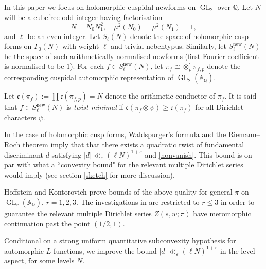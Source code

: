 \documentclass[12pt,reqno]{amsart}
\theoremstyle{plain}
\theoremstyle{remark}
\numberwithin{equation}{section}
\numberwithin{lemma}{section}
\numberwithin{theorem}{section}
\numberwithin{prop}{section}
\numberwithin{remark}{section}
\begin{document}
In this paper we focus on holomorphic cuspidal newforms 
on $\operatorname{GL}_2$ over $\mathbb{Q}$.
Let $N$ will be a cubefree odd integer having factorisation 
\begin{equation} \label{factorise}
N=N_0 N_1^2, \quad \mu^2(N_0)=\mu^2(N_1)=1,
\end{equation}
and $\ell$ be an even integer. Let $S_{\ell}(N)$ denote the space of holomorphic cusp forms 
on $\Gamma_0(N)$ with weight $\ell$ and trivial nebentypus. Similarly, let 
$S^{\text{new}}_{\ell}(N)$ be the space of such arithmetically normalised newforms 
(first Fourier coefficient is normalised to be $1$).
For each $f \in S^{\text{new}}_{\ell}(N)$, let $\pi_f \cong \otimes^{\prime}_p \pi_{f,p}$ 
denote the corresponding cuspidal automorphic representation of 
$\operatorname{GL}_2(\mathbb{A}_{\mathbb{Q}})$.  

Let $\mathfrak{c}(\pi_f):=\prod \mathfrak{c}(\pi_{f,p})=N$ 
denote the arithmetic conductor of $\pi_f$. 
It is said that $f \in S_{\ell}^{\text{new}}(N)$ is \emph{twist-minimal} if 
$\mathfrak{c}(\pi_f \otimes \psi) \geq \mathfrak{c}(\pi_f)$ for all Dirichlet 
characters $\psi$. 

In the case of holomorphic cusp forms,
Waldspurger's formula \cite{Wal}
and the Riemann--Roch theorem
imply that that there exists a quadratic twist of fundamental discriminant 
 $d$ satisfying $|d| \ll_{\varepsilon} (\ell N)^{1+\varepsilon}$
and \eqref{nonvanish}.
This bound is on par with what a ``convexity bound" 
for the relevant multiple Dirichlet series would imply 
(see section \ref{sketch} for more discussion). 

Hoffstein and Kontorovich 
\cite{HK} prove bounds of the above quality 
for general $\pi$ on $\operatorname{GL}_r(\mathbb{A}_{\mathbb{Q}})$, $r=1,2,3$.
The investigations in \cite{HK} are restricted to $r \leq 3$ in order to guarantee 
the relevant multiple Dirichlet series $Z(s,w;\pi)$
have meromorphic continuation past the point $(1/2,1)$. 

Conditional on a strong uniform quantitative subconvexity 
hypothesis for automorphic $L$-functions,
we improve the bound $|d| \ll_{\varepsilon} (\ell N)^{1+\varepsilon}$ 
in the level aspect, for some levels $N$.
\end{document}
